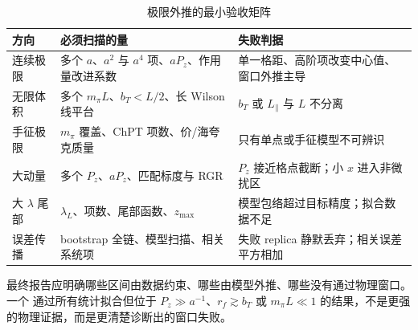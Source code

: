 \begin{table}[htbp]
\centering
\caption{极限外推的最小验收矩阵}
\label{tab:b03-extrapolation-checks}
\begin{tabularx}{\textwidth}{@{}>{\raggedright\arraybackslash}p{}X X@{}}
\toprule
方向 & 必须扫描的量 & 失败判据 \\
\midrule
连续极限 & 多个 \(a\)、\(a^2\) 与 \(a^4\) 项、\(aP_z\)、作用量改进系数 & 单一格距、高阶项改变中心值、窗口外推主导 \\
无限体积 & 多个 \(m_\pi L\)、\(b_T<L/2\)、长 Wilson 线平台 & \(b_T\) 或 \(L_\parallel\) 与 \(L\) 不分离 \\
手征极限 & \(m_\pi\) 覆盖、ChPT 项数、价/海夸克质量 & 只有单点或手征模型不可辨识 \\
大动量 & 多个 \(P_z\)、\(aP_z\)、匹配标度与 RGR & \(P_z\) 接近格点截断；小 \(x\) 进入非微扰区 \\
大 \(\lambda\) 尾部 & \(\lambda_L\)、项数、尾部函数、\(z_{\max}\) & 模型包络超过目标精度；拟合数据不足 \\
误差传播 & bootstrap 全链、模型扫描、相关系统项 & 失败 replica 静默丢弃；相关误差平方相加 \\
\bottomrule
\end{tabularx}
\end{table}

最终报告应明确哪些区间由数据约束、哪些由模型外推、哪些没有通过物理窗口。一个
通过所有统计拟合但位于 \(P_z\gg a^{-1}\)、\(r_f\gtrsim b_T\) 或
\(m_\pi L\ll1\) 的结果，不是更强的物理证据，而是更清楚诊断出的窗口失败。
